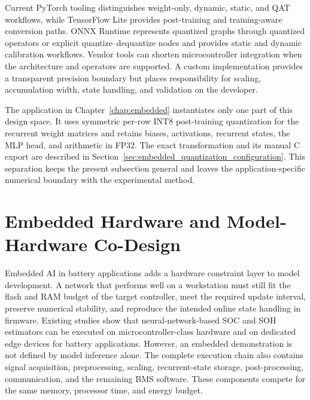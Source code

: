 \documentclass[
    a4paper,
    12pt,
    titlepage,
    bibliography=totoc,
    twoside=on,
    parskip=false,
    numbers=noenddot,
    cleardoublepage=empty,
    DIV=12,
    BCOR=12.0mm,
    headheight=36pt,
    headings=openright
]{scrreprt}
\begin{document}
Current PyTorch tooling distinguishes weight-only, dynamic, static, and QAT workflows, while TensorFlow Lite provides post-training and training-aware conversion paths.\autocite{pytorchAOQuantization2026,tensorflowPosttrainingQuantization2022} ONNX Runtime represents quantized graphs through quantized operators or explicit quantize--dequantize nodes and provides static and dynamic calibration workflows.\autocite{onnxRuntimeQuantization2026} Vendor tools can shorten microcontroller integration when the architecture and operators are supported. A custom implementation provides a transparent precision boundary but places responsibility for scaling, accumulation width, state handling, and validation on the developer.

The application in Chapter~\ref{chap:embedded} instantiates only one part of this design space. It uses symmetric per-row INT8 post-training quantization for the recurrent weight matrices and retains biases, activations, recurrent states, the MLP head, and arithmetic in FP32. The exact transformation and its manual C export are described in Section~\ref{sec:embedded_quantization_configuration}. This separation keeps the present subsection general and leaves the application-specific numerical boundary with the experimental method.

\FloatBarrier
\section{Embedded Hardware and Model-Hardware Co-Design}
\label{sec:fundamental_embedded_hardware}

Embedded AI in battery applications adds a hardware constraint layer to model development. A network that performs well on a workstation must still fit the flash and RAM budget of the target controller, meet the required update interval, preserve numerical stability, and reproduce the intended online state handling in firmware.\autocite{cordova-cardenasEdgeAIPractice2025,linTinyMachineLearning2023,naguibMicroprocessorExecutionTime2022} Existing studies show that neural-network-based SOC and SOH estimators can be executed on microcontroller-class hardware and on dedicated edge devices for battery applications.\autocite{giazitzisCaseStudyTiny2024,crocioniLiIonBatteriesParameter2020,Embedded_AI_only_SOC_mobile,shiueDesignImplementationDecentralized2026} However, an embedded demonstration is not defined by model inference alone. The complete execution chain also contains signal acquisition, preprocessing, scaling, recurrent-state storage, post-processing, communication, and the remaining BMS software. These components compete for the same memory, processor time, and energy budget.
\end{document}
